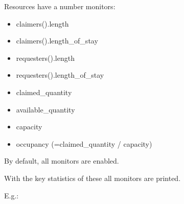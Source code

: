 \documentclass[letterpaper,10pt,english]{sphinxmanual}
\begin{document}
Resources have a number monitors:
\begin{itemize}
\item {} 
claimers().length

\item {} 
claimers().length\_of\_stay

\item {} 
requesters().length

\item {} 
requesters().length\_of\_stay

\item {} 
claimed\_quantity

\item {} 
available\_quantity

\item {} 
capacity

\item {} 
occupancy  (=claimed\_quantity / capacity)

\end{itemize}

By default, all monitors are enabled.

With  the key statistics of these all monitors are printed.

E.g.:
\end{document}
